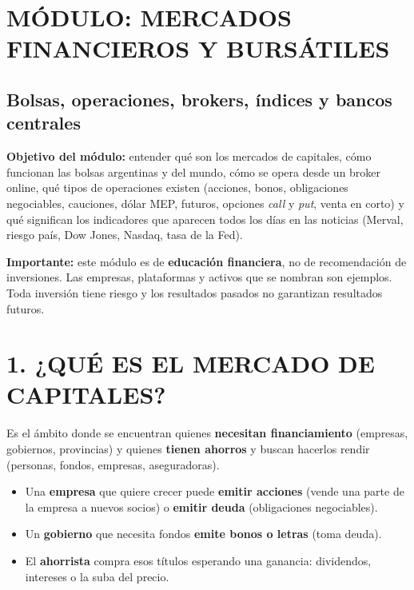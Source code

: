 \clearpage
\section*{MÓDULO: MERCADOS FINANCIEROS Y BURSÁTILES}
\subsection*{Bolsas, operaciones, brokers, índices y bancos centrales}

\begin{recuadro}
\textbf{Objetivo del módulo:} entender qué son los mercados de capitales, cómo funcionan las
bolsas argentinas y del mundo, cómo se opera desde un broker online, qué tipos de operaciones
existen (acciones, bonos, obligaciones negociables, cauciones, dólar MEP, futuros, opciones
\textit{call} y \textit{put}, venta en corto) y qué significan los indicadores que aparecen
todos los días en las noticias (Merval, riesgo país, Dow Jones, Nasdaq, tasa de la Fed).

\textbf{Importante:} este módulo es de \textbf{educación financiera}, no de recomendación de
inversiones. Las empresas, plataformas y activos que se nombran son ejemplos. Toda inversión
tiene riesgo y los resultados pasados no garantizan resultados futuros.
\end{recuadro}

\section*{1. ¿QUÉ ES EL MERCADO DE CAPITALES?}

Es el ámbito donde se encuentran quienes \textbf{necesitan financiamiento} (empresas, gobiernos,
provincias) y quienes \textbf{tienen ahorros} y buscan hacerlos rendir (personas, fondos,
empresas, aseguradoras).

\begin{itemize}
  \item Una \textbf{empresa} que quiere crecer puede \textbf{emitir acciones} (vende una parte
        de la empresa a nuevos socios) o \textbf{emitir deuda} (obligaciones negociables).
  \item Un \textbf{gobierno} que necesita fondos \textbf{emite bonos o letras} (toma deuda).
  \item El \textbf{ahorrista} compra esos títulos esperando una ganancia: dividendos, intereses
        o la suba del precio.
\end{itemize}

